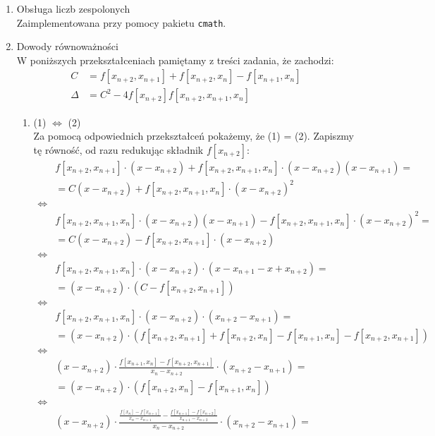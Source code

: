 \documentclass[12pt]{article}
\newcommand{\0}{x_{n}}
\newcommand{\1}{x_{n+1}}
\newcommand{\2}{x_{n+2}}
\newcommand{\3}{x_{n+3}}
\begin{document}
\begin{enumerate}[1.]
\large\bf\item Obsługa liczb zespolonych \smallskip \\
\normalfont
\normalsize
Zaimplementowana przy pomocy pakietu \texttt{cmath}.\\

\large\bf\item Dowody równoważności \smallskip \\
\normalfont
\normalsize
W poniższych przekształceniach pamiętamy z treści \mbox{zadania}, że zachodzi:
\begin{align*}
C &= f[\2, \1] + f[\2, \0] - f[\1, \0] \\[1ex]
\Delta &= C^2 - 4f[\2]f[\2, \1, \0]
\end{align*}
\begin{enumerate}[$\bullet$]
\pagebreak
\newpage
\item (1) $\Leftrightarrow$ (2) \medskip \\
Za pomocą odpowiednich przekształceń pokażemy, że (1) = (2). Zapiszmy tę równość, od razu redukując składnik $f[\2]$:
\begin{align*}
&f[\2,\1] \cdot (x - \2) + f[\2, \1, \0] \cdot (x - \2)(x - \1) = \\[1ex]
&= C(x - \2) + f[\2, \1, \0] \cdot (x - \2)^2 \\
\Leftrightarrow & \\
&f[\2, \1, \0] \cdot (x - \2)(x - \1) - f[\2, \1, \0] \cdot (x - \2)^2 = \\[1ex]
&= C(x - \2) - f[\2,\1] \cdot (x - \2) \\
\Leftrightarrow & \\
&f[\2, \1, \0] \cdot (x - \2) \cdot \left( x - \1 - x + \2 \right) = \\[1ex]
&= (x - \2) \cdot \left( C - f[\2, \1] \right) \\
\Leftrightarrow & \\
&f[\2, \1, \0] \cdot (x - \2) \cdot (\2 - \1) = \\[1ex]
&= (x - \2) \cdot \left(f[\2, \1] + f[\2, \0] - f[\1, \0] - f[\2, \1] \right) \\
\Leftrightarrow & \\
& (x - \2) \cdot \frac{f[\1, \0] - f[\2, \1]}{\0 - \2} \cdot (\2 - \1) = \\[1ex]
&= (x - \2) \cdot \left(f[\2, \0] - f[\1, \0]\right) \\
\Leftrightarrow & \\
& (x - \2) \cdot \frac{\frac{f[\0] - f[\1]}{\0 - \1} - \frac{f[\1] - f[\2]}{\1 - \2}}{\0 - \2} \cdot (\2 - \1) = \\[1ex]

\end{align*}
\end{enumerate}
\end{enumerate}
\end{document}

